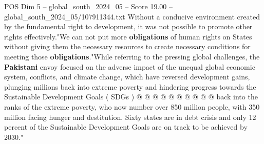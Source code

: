 \begin{textsample}{POS Dim 5 – global\_south\_2024\_05 – Score 19.00 – global\_south\_2024\_05/107911344.txt}
Without a conducive environment created by the fundamental right to development, it was not possible to promote other rights effectively."We can not put more \textbf{obligations} of human rights on States without giving them the necessary resources to create necessary conditions for meeting those \textbf{obligations}."While referring to the pressing global challenges, the \textbf{Pakistani} envoy focused on the adverse impact of the unequal global economic system, conflicts, and climate change, which have reversed development gains, plunging millions back into extreme poverty and hindering progress towards the Sustainable Development Goals ( SDGs ) @ @ @ @ @ @ @ @ @ @ back into the ranks of the extreme poverty, who now number over 850 million people, with 350 million facing hunger and destitution.
Sixty states are in debt crisis and only 12 percent of the Sustainable Development Goals are on track to be achieved by 2030."

\end{textsample}

